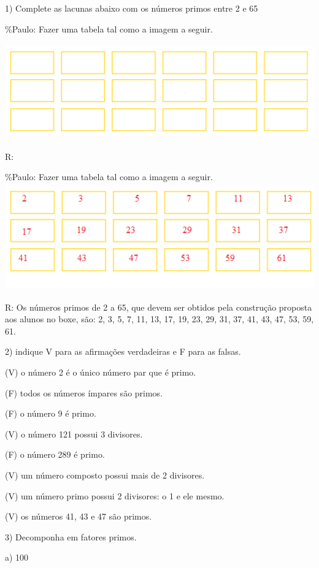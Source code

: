 
1) Complete as lacunas abaixo com os números primos entre 2 e 65

\%Paulo: Fazer uma tabela tal como a imagem a seguir.

\includegraphics[width=5.54167in,height=1.625in]{./imgSAEB_6_MAT/media/image9.png}

R:

\%Paulo: Fazer uma tabela tal como a imagem a seguir.
\includegraphics[width=5.47708in,height=1.81389in]{./imgSAEB_6_MAT/media/image10.png}

R: Os números primos de 2 a 65, que devem ser obtidos pela construção
proposta aos alunos no boxe, são: 2, 3, 5, 7, 11, 13, 17, 19, 23, 29,
31, 37, 41, 43, 47, 53, 59, 61.

2) indique V para as afirmações verdadeiras e F para as falsas.

(V) o número 2 é o único número par que é primo.

(F) todos os números ímpares são primos.

(F) o número 9 é primo.

(V) o número 121 possui 3 divisores.

(F) o número 289 é primo.

(V) um número composto possui mais de 2 divisores.

(V) um número primo possui 2 divisores: o 1 e ele mesmo.

(V) os números 41, 43 e 47 são primos.

3) Decomponha em fatores primos.

a) 100

